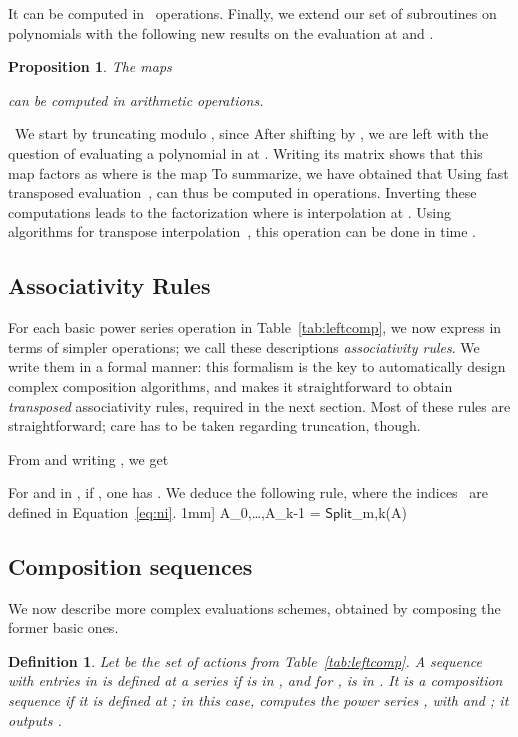 \documentclass{sig-alternate}
\def\Root {\ensuremath{\mathsf{Split}}}
\def\myproof{\noindent{\sc Proof.}~}
\def\foorp{\hfill}
\newtheorem{Def}{Definition}
\newtheorem{Prop}{Proposition}
\begin{document}
It can be computed in~ operations.
Finally, we extend our set of subroutines on polynomials with the
following new results on the evaluation at  and .
\begin{Prop}\label{Prop:xp} The maps

can be computed in  arithmetic operations.  
\end{Prop}
\myproof We start by truncating  modulo , since
 After shifting by , we
are left with the question of evaluating a polynomial in  at
. Writing its matrix shows that this map factors
as  where 
is the map
 To summarize,
we have obtained that
 Using fast
transposed evaluation~\cite{CaKaLa89,BoLeSc03},  can
thus be computed in  operations.  Inverting these
computations leads to the factorization
 where 
is interpolation at . Using algorithms for transpose
interpolation~\cite{KaLa88,BoLeSc03}, this operation can be done in
time .  \foorp



\subsection{Associativity Rules}\label{ssec:ar}

For each basic power series operation in Table~\ref{tab:leftcomp}, we
now express  in terms of simpler operations; we
call these descriptions \emph{associativity rules}. We write them in a
formal manner: this formalism is the key to automatically design
complex composition algorithms, and makes it straightforward to obtain
\emph{transposed} associativity rules, required in the next section.
Most of these rules are straightforward; care has to be taken
regarding truncation, though.

\smallskip{}




  From  and writing , we get



\smallskip{} For  and  in ,
if , one has . We deduce the following rule, where the
indices~ are defined in Equation~\eqref{eq:ni}.
1mm]
A_0,\dots,A_{k-1} = \Root_{m,k}(A)\notag\
\vskip-4mm








\subsection{Composition sequences}\label{ssec:comp}
We now describe more complex evaluations schemes, obtained by
composing the former basic ones. 
\begin{Def}Let  be the set of actions
from Table~\ref{tab:leftcomp}. A sequence  with
entries in  is \emph{defined at a series}  if  is
in , and for ,  is in
. It is a \emph{composition sequence} if it is defined at
; in this case,  \emph{computes} the power series
, with  and ; it
\emph{outputs} .
\end{Def}
\end{document}
